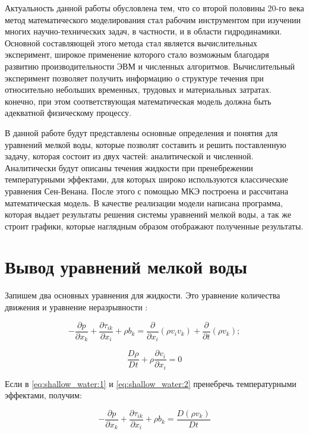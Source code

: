 \documentclass[14pt]{extreport}
\begin{document}
Актуальность данной работы обусловлена тем, что со второй половины 20-го века метод математического моделирования стал рабочим инструментом при изучении многих научно-технических задач, в частности, и в области гидродинамики. Основной составляющей этого метода стал является вычислительных эксперимент, широкое применение которого стало возможным благодаря развитию производительности ЭВМ и численных алгоритмов. Вычислительный эксперимент позволяет получить информацию о структуре течения при относительно небольших временных, трудовых и материальных затратах. конечно, при этом соответствующая математическая модель должна быть адекватной физическому процессу.

В данной работе будут представлены основные определения и понятия для уравнений мелкой воды, которые позволят составить и решить поставленную задачу, которая состоит из двух частей: аналитической и численной. Аналитически будут описаны течения жидкости при пренебрежении температурными эффектами, для которых широко используются классические уравнения Сен-Венана. После этого с помощью МКЭ построена и рассчитана математическая модель. В качестве реализации модели написана программа, которая выдает результаты решения системы уравнений мелкой воды, а так же строит графики, которые наглядным образом отображают полученные результаты.

\chapter{Вывод уравнений мелкой воды}

Запишем два основных уравнения для жидкости. Это уравнение количества движения и уравнение неразрывности \cite{bib:fem:konor}:

\begin{equation}\label{eq:shallow_water:1}
-\frac{\partial p}{\partial x_k} + \frac{\partial \tau_{ik}}{\partial x_i} + \rho b_k = \frac{\partial}{\partial x_i}(\rho v_i v_k) + \frac{\partial}{\partial t}(\rho v_k);
\end{equation}

\begin{equation}\label{eq:shallow_water:2}
\frac{D\rho}{Dt}+\rho \frac{\partial v_i}{\partial x_i} =0
\end{equation}

Если в \ref{eq:shallow_water:1} и \ref{eq:shallow_water:2} пренебречь температурными эффектами, получим:

\begin{equation}\label{eq:shallow_water:3}
-\frac{\partial p}{\partial x_k} + \frac{\partial \tau_{ik}}{\partial x_i} + \rho b_k = \frac{D(\rho v_k)}{Dt}
\end{equation}
\end{document}
